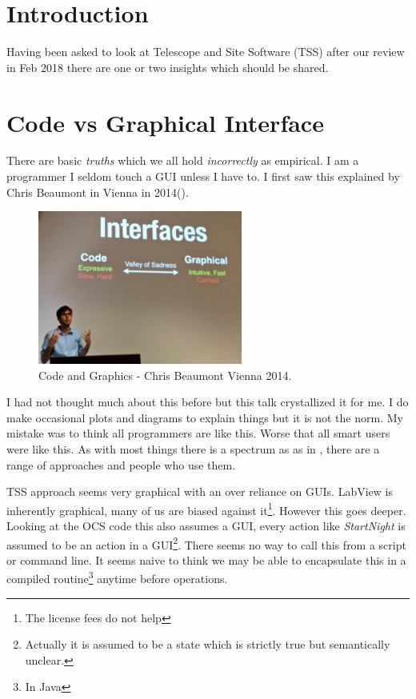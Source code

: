 \section{Introduction} \label{sec:intro}
Having  been asked to look at Telescope and Site Software (TSS) after our review in Feb 2018  there are  one or two insights which should be shared.


\section{Code vs  Graphical Interface }

There are basic {\em truths} which we all hold {\em incorrectly} as empirical. I am a programmer I seldom touch a GUI unless I have to. I first saw this explained by Chris Beaumont in Vienna in 2014().
\begin{figure}
\begin{center}
\includegraphics[width=0.6\textwidth]{beaumontCG}
\caption{Code and Graphics - Chris Beaumont Vienna 2014. \label{fig:gspec}}
\end{center}
\end{figure}

I had not thought much about this before but this talk crystallized it for me. I do make occasional plots and diagrams to explain things but it is not the norm. My mistake was to think all programmers are like this. Worse that all smart users were like this.
As with most things there is a spectrum as as in , there are a range of approaches and people who use them.

TSS approach seems very graphical with an over  reliance on GUIs.
LabView is inherently graphical, many of us are biased against it\footnote{The license fees do not help}.
However  this goes deeper. Looking at the OCS code this also assumes a GUI, every action like {\em StartNight} is assumed to be an action in a GUI\footnote{Actually it is assumed to be a state which is strictly true but semantically unclear. }.
There seems no way to call this from a script or command line. It seems naive to think we may be able to encapsulate this in a compiled routine\footnote{In Java} anytime before operations.


